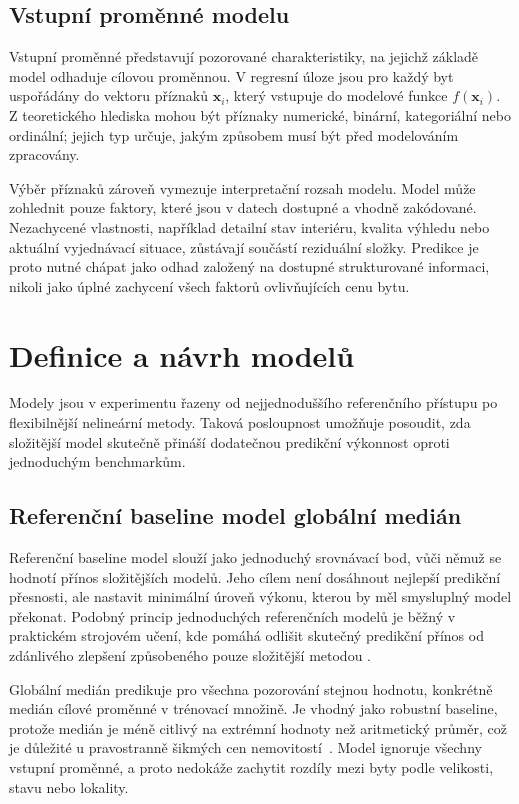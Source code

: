 \subsection{Vstupní proměnné modelu}
\label{subsec:model_features}

Vstupní proměnné představují pozorované charakteristiky, na jejichž základě model odhaduje cílovou proměnnou. V regresní úloze jsou pro každý byt uspořádány do vektoru příznaků \(\mathbf{x}_i\), který vstupuje do modelové funkce \(f(\mathbf{x}_i)\). Z teoretického hlediska mohou být příznaky numerické, binární, kategoriální nebo ordinální; jejich typ určuje, jakým způsobem musí být před modelováním zpracovány.

Výběr příznaků zároveň vymezuje interpretační rozsah modelu. Model může zohlednit pouze faktory, které jsou v datech dostupné a vhodně zakódované. Nezachycené vlastnosti, například detailní stav interiéru, kvalita výhledu nebo aktuální vyjednávací situace, zůstávají součástí reziduální složky.
Predikce je proto nutné chápat jako odhad založený na dostupné strukturované informaci, nikoli jako úplné zachycení všech faktorů ovlivňujících cenu bytu.

\section{Definice a návrh modelů}
\label{sec:model_design}

Modely jsou v experimentu řazeny od nejjednoduššího referenčního přístupu po flexibilnější nelineární metody. Taková posloupnost umožňuje posoudit, zda složitější model skutečně přináší dodatečnou predikční výkonnost oproti jednoduchým benchmarkům.

\subsection*{Referenční baseline model globální medián}
\label{subsec:baseline_models}

Referenční baseline model slouží jako jednoduchý srovnávací bod, vůči němuž se hodnotí přínos složitějších modelů. Jeho cílem není dosáhnout nejlepší predikční přesnosti, ale nastavit minimální úroveň výkonu, kterou by měl smysluplný model překonat. Podobný princip jednoduchých referenčních modelů je
běžný v praktickém strojovém učení, kde pomáhá odlišit skutečný predikční přínos od zdánlivého zlepšení způsobeného pouze složitější metodou
\cite{Pedregosa2011ScikitLearn}.

Globální medián predikuje pro všechna pozorování stejnou hodnotu, konkrétně medián cílové proměnné v trénovací množině. Je vhodný jako robustní baseline, protože medián je méně citlivý na extrémní hodnoty než aritmetický průměr,
což je důležité u pravostranně šikmých cen nemovitostí~\cite{Tukey1977EDA}.
Model ignoruje všechny vstupní proměnné, a proto nedokáže zachytit rozdíly mezi byty podle velikosti, stavu nebo lokality.


